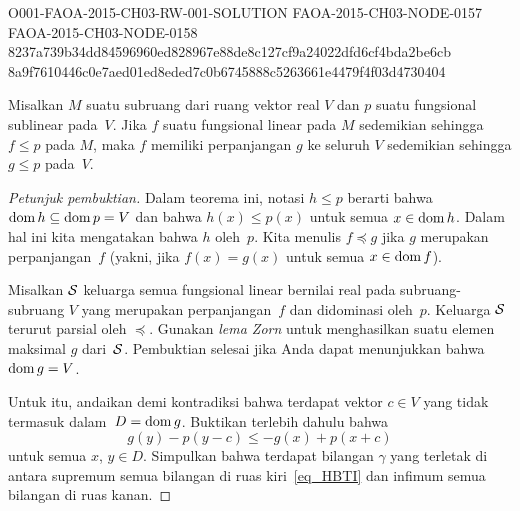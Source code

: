 \begin{o001readerwork}
  {O001-FAOA-2015-CH03-RW-001-SOLUTION}
  {FAOA-2015-CH03-NODE-0157}
  {FAOA-2015-CH03-NODE-0158}
  {8237a739b34dd84596960ed828967e88de8c127cf9a24022dfd6cf4bda2be6cb}
  {8a9f7610446c0e7aed01ed8eded7c0b6745888c5263661e4479f4f03d4730404}
\begin{o001result}
\begin{thm}\label{HBTI} Misalkan $M$ suatu subruang dari ruang vektor real $V$ dan $p$
suatu fungsional sublinear pada~$V$. Jika $f$ suatu fungsional linear pada $M$ sedemikian sehingga $f \le p$ pada $M$, maka
$f$ memiliki perpanjangan $g$ ke seluruh $V$ sedemikian sehingga $g \le p$ pada~$V$.
\end{thm}
\end{o001result}
\begin{o001sourcehint}
\begin{proof}[\emph{Petunjuk pembuktian}] Dalam teorema ini, notasi $h \le p$ berarti bahwa $\operatorname{dom} h \subseteq \operatorname{dom} p = V$
dan bahwa $h(x) \le p(x)$ untuk semua $x \in \operatorname{dom} h$. Dalam hal ini kita mengatakan bahwa $h$
 oleh~$p$. Kita menulis
$f \preccurlyeq g$ jika $g$ merupakan perpanjangan~$f$ (yakni,
jika $f(x) = g(x)$ untuk semua $x \in \operatorname{dom} f$).

Misalkan $\mathcal{S}$ keluarga semua fungsional linear bernilai real pada subruang-subruang $V$ yang merupakan perpanjangan~$f$ dan
didominasi oleh~$p$. Keluarga $\mathcal{S}$ terurut parsial oleh $\preccurlyeq$. Gunakan \emph{lema Zorn} untuk menghasilkan suatu
elemen maksimal $g$ dari~$\mathcal{S}$. Pembuktian selesai jika Anda dapat menunjukkan bahwa $\operatorname{dom}{g} = V$.

Untuk itu, andaikan demi kontradiksi bahwa terdapat vektor $c \in V$ yang tidak termasuk dalam~$D = \operatorname{dom}{g}$. Buktikan terlebih dahulu bahwa
   \begin{equation}\label{eq_HBTI}
      g(y) - p(y - c) \le - g(x) + p(x + c)
   \end{equation}
untuk semua $x$, $y \in D$. Simpulkan bahwa terdapat bilangan $\gamma$ yang terletak di antara supremum semua bilangan
di ruas kiri~\eqref{eq_HBTI} dan infimum semua bilangan di ruas kanan.


\end{proof}
\end{o001sourcehint}
\end{o001readerwork}
